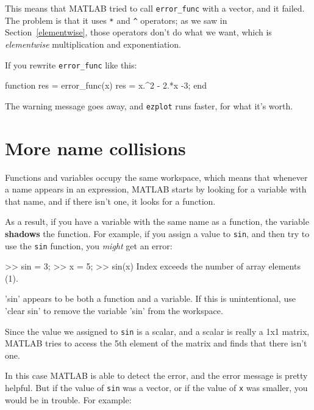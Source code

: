 \documentclass[
]{book}
\numberwithin{Answer}{chapter}
\numberwithin{Exercise}{chapter}
\begin{document}
This means that MATLAB tried to call \verb"error_func" with a vector, and it failed. 
The problem is that it uses \verb"*" and \verb"^" operators; as we saw in Section~\ref{elementwise}, those operators don't do what we want, which is {\em elementwise} multiplication and exponentiation.


If you rewrite \verb"error_func" like this:

\begin{code}
function res = error_func(x)
    res = x.^2 - 2.*x -3;
end
\end{code}

The warning message goes away, and {\tt ezplot} runs faster, for what it's worth.



\section{More name collisions}

Functions and variables occupy the same workspace, which means
that whenever a name appears in an expression, MATLAB starts by looking
for a variable with that name, and if there isn't one, it looks for
a function.


As a result, if you have a variable with the same name as a function,
the variable {\bf shadows} the function.  For example, if you assign
a value to {\tt sin}, and then try to use the {\tt sin} function, you
{\em might} get an error:

\begin{code}
>> sin = 3;
>> x = 5;
>> sin(x)
Index exceeds the number of array elements (1).

'sin' appears to be both a function and a variable.
If this is unintentional, use 'clear sin' to remove 
the variable 'sin' from the workspace.
\end{code}

Since the value we assigned to {\tt sin} is a scalar, and a scalar is really a 1x1 matrix, MATLAB tries to access the 5th element of the matrix and finds that there isn't one.

In this case MATLAB is able to detect the error, and the error message is pretty helpful.
But if the value of {\tt sin} was a vector, or if the value of {\tt x} was smaller, you would be in trouble.  For example:
\end{document}
